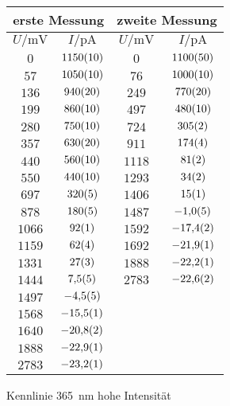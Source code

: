 \begin{figure}[htbp]
   \centering
\caption{Kennlinie \SI{365}{nm} hohe Intensität}
\begin{tabular}{cc||cc}
\hline\multicolumn{2}{c||}{erste Messung} & \multicolumn{2}{c}{zweite Messung}\\

\hline
$U / \unit{\milli\volt}$ & $I / \unit{\pico\ampere}$ & $U / \unit{\milli\volt}$ & $I / \unit{\pico\ampere}$ \\ 
\hline
$\num{0}$ & $\num{1150\pm 10}$ & $\num{0}$ & $\num{1100\pm 50}$ \\
$\num{57}$ & $\num{1050\pm 10}$ & $\num{76}$ & $\num{1000\pm 10}$ \\
$\num{136}$ & $\num{940\pm 20}$ & $\num{249}$ & $\num{770\pm 20}$ \\
$\num{199}$ & $\num{860\pm 10}$ & $\num{497}$ & $\num{480\pm 10}$ \\
$\num{280}$ & $\num{750\pm 10}$ & $\num{724}$ & $\num{305\pm 2}$ \\
$\num{357}$ & $\num{630\pm 20}$ & $\num{911}$ & $\num{174\pm 4}$ \\
$\num{440}$ & $\num{560\pm 10}$ & $\num{1118}$ & $\num{81\pm 2}$ \\
$\num{550}$ & $\num{440\pm 10}$ & $\num{1293}$ & $\num{34\pm 2}$ \\
$\num{697}$ & $\num{320\pm 5}$ & $\num{1406}$ & $\num{15\pm 1}$ \\
$\num{878}$ & $\num{180\pm 5}$ & $\num{1487}$ & $\num{-1.0\pm 0.5}$ \\
$\num{1066}$ & $\num{92\pm 1}$ & $\num{1592}$ & $\num{-17.4\pm 0.2}$ \\
$\num{1159}$ & $\num{62\pm 4}$ & $\num{1692}$ & $\num{-21.9\pm 0.1}$ \\
$\num{1331}$ & $\num{27\pm 3}$ & $\num{1888}$ & $\num{-22.2\pm 0.1}$ \\
$\num{1444}$ & $\num{7.5\pm 0.5}$ & $\num{2783}$ & $\num{-22.6\pm 0.2}$ \\
$\num{1497}$ & $\num{-4.5\pm 0.5}$ &    &    \\
$\num{1568}$ & $\num{-15.5\pm 0.1}$ &    &    \\
$\num{1640}$ & $\num{-20.8\pm 0.2}$ &    &    \\
$\num{1888}$ & $\num{-22.9\pm 0.1}$ &    &    \\
$\num{2783}$ & $\num{-23.2\pm 0.1}$ &    &    \\
\hline\end{tabular}
\label{kennlinie_365nm_hohe_intensität}
\end{figure}